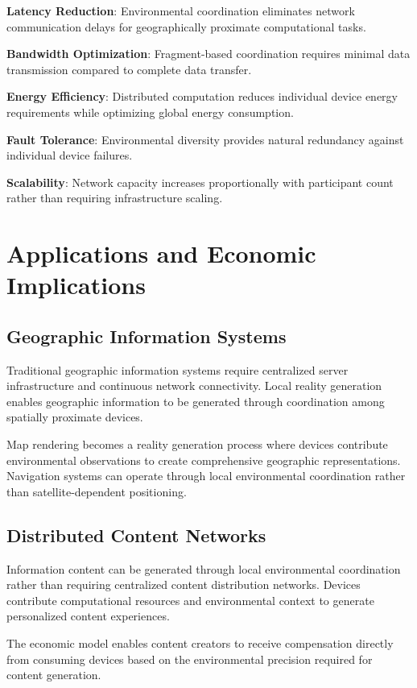\documentclass[12pt]{article}
\begin{document}
\textbf{Latency Reduction}: Environmental coordination eliminates network communication delays for geographically proximate computational tasks.

\textbf{Bandwidth Optimization}: Fragment-based coordination requires minimal data transmission compared to complete data transfer.

\textbf{Energy Efficiency}: Distributed computation reduces individual device energy requirements while optimizing global energy consumption.

\textbf{Fault Tolerance}: Environmental diversity provides natural redundancy against individual device failures.

\textbf{Scalability}: Network capacity increases proportionally with participant count rather than requiring infrastructure scaling.

\section{Applications and Economic Implications}

\subsection{Geographic Information Systems}

Traditional geographic information systems require centralized server infrastructure and continuous network connectivity. Local reality generation enables geographic information to be generated through coordination among spatially proximate devices.

Map rendering becomes a reality generation process where devices contribute environmental observations to create comprehensive geographic representations. Navigation systems can operate through local environmental coordination rather than satellite-dependent positioning.

\subsection{Distributed Content Networks}

Information content can be generated through local environmental coordination rather than requiring centralized content distribution networks. Devices contribute computational resources and environmental context to generate personalized content experiences.

The economic model enables content creators to receive compensation directly from consuming devices based on the environmental precision required for content generation.
\end{document}
